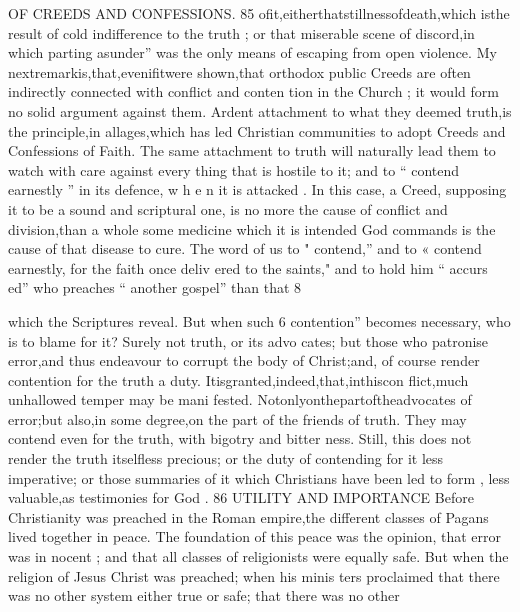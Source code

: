 \documentclass[
]{book}
\begin{document}
OF CREEDS AND CONFESSIONS. 85
ofit,eitherthatstillnessofdeath,which isthe
result of cold indifference to the truth ; or that
miserable scene of discord,in which parting
asunder'' was the only means of escaping from open violence.
My nextremarkis,that,evenifitwere shown,that orthodox public Creeds are often indirectly connected with conflict and conten
tion in the Church ; it would form no solid
argument against them. Ardent attachment
to what they deemed truth,is the principle,in
allages,which has led Christian communities
to adopt Creeds and Confessions of Faith.
The same attachment to truth will naturally lead them to watch with care against every
thing that is hostile to it; and to `` contend earnestly '' in its defence, w h e n it is attacked .
In this case, a Creed, supposing it to be a sound and scriptural one, is no
more the cause of conflict and division,than a whole
some medicine which it is intended
God commands
is the cause of that disease to cure. The word of us to " contend,'' and to
« contend earnestly, for the faith once deliv ered to the saints," and to hold him `` accurs
ed'' who preaches `` another gospel'' than that
8

which the Scriptures reveal. But when such 6 contention'' becomes necessary, who is to
blame for it? Surely not truth, or its advo cates; but those who patronise error,and thus
endeavour to corrupt the body of Christ;and, of course render contention for the truth a
duty. Itisgranted,indeed,that,inthiscon flict,much unhallowed temper may be mani fested. Notonlyonthepartoftheadvocates of error;but also,in some degree,on the part of the friends of truth. They may contend even for the truth, with bigotry and bitter ness. Still, this does not render the truth
itselfless precious; or the duty of contending for it less imperative; or those summaries of it which Christians have been led to form , less valuable,as testimonies for God .
86 UTILITY AND IMPORTANCE
Before Christianity was preached in the
Roman empire,the different classes of Pagans lived together in peace. The foundation of
this peace was the opinion, that error was in nocent ; and that all classes of religionists were equally safe. But when the religion of Jesus Christ was preached; when his minis ters proclaimed that there was no other system
either true or safe; that there was no other
\end{document}
